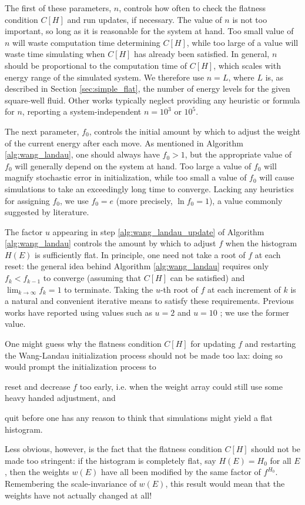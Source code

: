 \documentclass[11pt]{article}
\newcommand{\p}[1]{\left(#1\right)} %
\renewcommand{\sp}[1]{\left[#1\right]} %
\begin{document}
The first of these parameters, $n$, controls how often to check the
flatness condition $C\sp{H}$ and run updates, if necessary. The value
of $n$ is not too important, so long as it is reasonable for the
system at hand. Too small value of $n$ will waste computation time
determining $C\sp{H}$, while too large of a value will waste time
simulating when $C\sp{H}$ has already been satisfied. In general, $n$
should be proportional to the computation time of $C\sp{H}$, which
scales with energy range of the simulated system. We therefore use
$n=L$, where $L$ is, as described in Section \ref{sec:simple_flat},
the number of energy levels for the given square-well fluid. Other
works typically neglect providing any heuristic or formula for $n$,
reporting a system-independent $n=10^3$\cite{wang_landau_mod} or
$10^5$\cite{wang_landau}.

The next parameter, $f_0$, controls the initial amount by which to
adjust the weight of the current energy after each move. As mentioned
in Algorithm \ref{alg:wang_landau}, one should always have $f_0>1$,
but the appropriate value of $f_0$ will generally depend on the system
at hand. Too large a value of $f_0$ will magnify stochastic error in
initialization, while too small a value of $f_0$ will cause
simulations to take an exceedingly long time to converge. Lacking any
heuristics for assigning $f_0$, we use $f_0=e$ (more precisely, $\ln
f_0=1$), a value commonly suggested by literature\cite{wang_landau}.

The factor $u$ appearing in step \ref{alg:wang_landau_update} of
Algorithm \ref{alg:wang_landau} controls the amount by which to adjust
$f$ when the histogram $H\p{E}$ is sufficiently flat. In principle,
one need not take a root of $f$ at each reset: the general idea behind
Algorithm \ref{alg:wang_landau} requires only $f_k<f_{k-1}$ to
converge (assuming that $C\sp{H}$ can be satisfied) and
$\lim_{k\to\infty}f_k=1$ to terminate. Taking the $u$-th root of $f$
at each increment of $k$ is a natural and convenient iterative means
to satisfy these requirements. Previous works have reported using
values such as $u=2$ \cite{wang_landau, wang_landau_mod} and $u=10$
\cite{wang_landau_analysis}; we use the former value.

One might guess why the flatness condition $C\sp{H}$ for updating $f$
and restarting the Wang-Landau initialization process should not be
made too lax: doing so would prompt the initialization process to
\begin{enumerate*}[label=\roman*)]
\item reset and decrease $f$ too early, i.e. when the weight array
  could still use some heavy handed adjustment, and
\item quit before one has any reason to think that simulations might
  yield a flat histogram.
\end{enumerate*}
Less obvious, however, is the fact that the flatness condition
$C\sp{H}$ should not be made too stringent: if the histogram is
completely flat, say $H\p{E}=H_0$ for all $E$, then the weights
$w\p{E}$ have all been modified by the same factor of $f^{H_0}$.
Remembering the scale-invariance of $w\p{E}$, this result would mean
that the weights have not actually changed at all!
\end{document}
